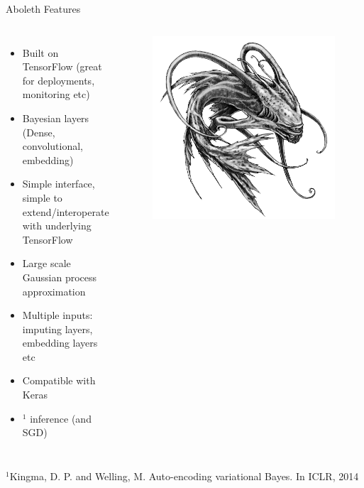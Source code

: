 \documentclass[lualatex, aspectratio=169]{beamer}
\begin{document}
\begin{frame}{Aboleth Features}
  \begin{columns}
    \column{0.7\pagewidth}
    \begin{itemize}
      \item Built on TensorFlow (great for deployments, monitoring etc)
      \item Bayesian layers (Dense, convolutional, embedding)
      \item Simple interface, simple to extend/interoperate with underlying TensorFlow
      \item Large scale Gaussian process approximation
      \item Multiple inputs: imputing layers, embedding layers etc
      \item Compatible with Keras
      \item {}$^1$ inference (and SGD)
    \end{itemize}
    \column{0.25\pagewidth}
    \begin{figure}
      \includegraphics[width=0.25\pagewidth]{assets/aboleth.jpg}
    \end{figure}
  \end{columns}
  \tiny{$^1$Kingma, D. P. and Welling, M. Auto-encoding variational Bayes. In ICLR, 2014}
\end{frame}
\end{document}
